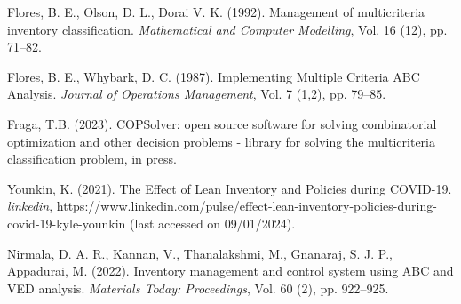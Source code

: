 \documentclass[authoryear,manuscript,12pt]{elsarticle}
\begin{document}




\begin{thebibliography}{1}


Flores, B. E., Olson, D. L., Dorai V. K. (1992). Management of multicriteria inventory classification. {\it Mathematical and Computer Modelling}, Vol. 16 (12), pp. 71--82.

Flores, B. E., Whybark, D. C. (1987). Implementing Multiple Criteria ABC Analysis. {\it Journal of Operations Management}, Vol. 7 (1,2), pp. 79--85.

Fraga, T.B. (2023). COPSolver: open source software for solving combinatorial optimization and other decision problems - library for solving the multicriteria classification problem, in press.

Younkin, K. (2021). The Effect of Lean Inventory and Policies during COVID-19. {\it linkedin}, https://www.linkedin.com/pulse/effect-lean-inventory-policies-during-covid-19-kyle-younkin (last accessed on 09/01/2024).

Nirmala, D. A. R., Kannan, V., Thanalakshmi, M., Gnanaraj, S. J. P., Appadurai, M. (2022). Inventory management and control system using ABC and VED analysis. {\it Materials Today: Proceedings}, Vol. 60 (2), pp. 922--925.

\end{thebibliography}
\end{document}
